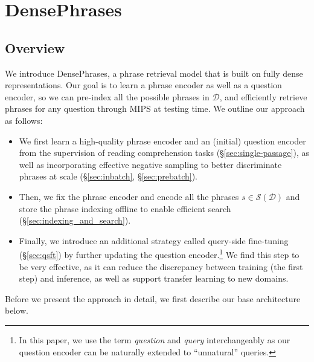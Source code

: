 \documentclass[11pt,a4paper]{article}
\newcommand{\ours}{DensePhrases}
\newcommand{\phraseset}{\mathcal{S}(\mathcal{D})}
\newcommand\ti[1]{\textit{#1}}
\begin{document}
 
 


\section{{\ours}}

\subsection{Overview}

We introduce {\ours}, a phrase retrieval model that is built on fully dense representations.
Our goal is to learn a {phrase} encoder as well as a {question} encoder, so we can pre-index all the possible phrases in $\mathcal{D}$, and efficiently retrieve phrases for any question through MIPS at testing time. We outline our approach as follows:
\begin{itemize}[noitemsep]
\item
We first learn a high-quality phrase encoder and an (initial) question encoder from the supervision of reading comprehension tasks (\S\ref{sec:single-passage}), as well as incorporating effective negative sampling to better discriminate phrases at scale (\S\ref{sec:inbatch}, \S\ref{sec:prebatch}).
\item
Then, we fix the phrase encoder and encode all the phrases $s \in \phraseset$ and store the phrase indexing offline to enable efficient search (\S\ref{sec:indexing_and_search}).
\item
Finally, we introduce an additional strategy called query-side fine-tuning (\S\ref{sec:qsft}) by further updating the question encoder.\footnote{In this paper, we use the term \ti{question} and \ti{query} interchangeably as our question encoder can be naturally extended to ``unnatural'' queries.} We find this step to be very effective, as it can reduce the discrepancy between training (the first step) and inference, as well as support transfer learning to new domains.
\end{itemize}

Before we present the approach in detail, we first describe our base architecture below.
\end{document}
